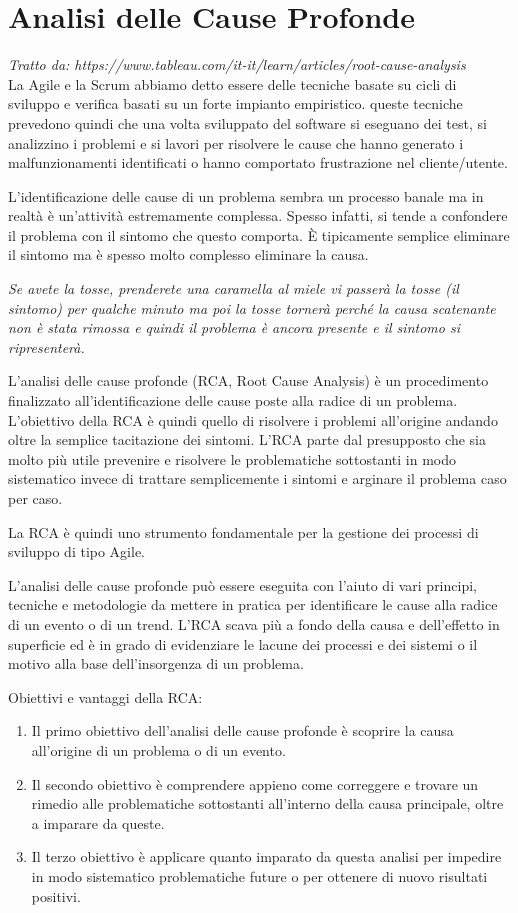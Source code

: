 \section{Analisi delle Cause Profonde}
\textit{ \tiny Tratto da: https://www.tableau.com/it-it/learn/articles/root-cause-analysis}\\


La Agile e la Scrum abbiamo detto essere delle tecniche basate su cicli di sviluppo e verifica basati su un forte impianto empiristico. queste tecniche prevedono quindi che una volta sviluppato del software si eseguano dei test, si analizzino i problemi e si lavori per risolvere le cause che hanno generato i malfunzionamenti identificati o hanno comportato frustrazione nel cliente/utente.

L'identificazione delle cause di un problema sembra un processo banale ma in realtà è un'attività estremamente complessa. Spesso infatti, si tende a confondere il problema con il sintomo che questo comporta. È tipicamente semplice eliminare il sintomo ma è spesso molto complesso eliminare la causa.

\textit{Se avete la tosse, prenderete una caramella al miele vi passerà la tosse (il sintomo) per qualche minuto ma poi la tosse tornerà perché la causa scatenante non è stata rimossa e quindi il problema è ancora presente e il sintomo si ripresenterà.}

L'analisi delle cause profonde (RCA, Root Cause Analysis) è un procedimento finalizzato all'identificazione delle cause poste alla radice di un problema. L'obiettivo della RCA è quindi quello di risolvere i problemi all'origine andando oltre la semplice tacitazione dei sintomi. L'RCA parte dal presupposto che sia molto più utile prevenire e risolvere le problematiche sottostanti in modo sistematico invece di trattare semplicemente i sintomi e arginare il problema caso per caso.

La RCA è quindi uno strumento fondamentale per la gestione dei processi di sviluppo di tipo Agile.

L'analisi delle cause profonde può essere eseguita con l'aiuto di vari principi, tecniche e metodologie da mettere in pratica per identificare le cause alla radice di un evento o di un trend. L'RCA scava più a fondo della causa e dell'effetto in superficie ed è in grado di evidenziare le lacune dei processi e dei sistemi o il motivo alla base dell'insorgenza di un problema.

Obiettivi e vantaggi della RCA:
\begin{enumerate}
    \item Il primo obiettivo dell'analisi delle cause profonde è scoprire la causa all'origine di un problema o di un evento.
    \item Il secondo obiettivo è comprendere appieno come correggere e trovare un rimedio alle problematiche sottostanti all'interno della causa principale, oltre a imparare da queste.
    \item Il terzo obiettivo è applicare quanto imparato da questa analisi per impedire in modo sistematico problematiche future o per ottenere di nuovo risultati positivi.

\end{enumerate}

